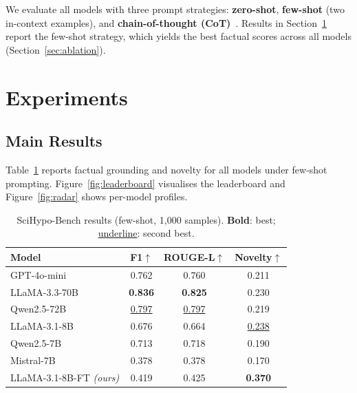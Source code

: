 \documentclass{article}
\begin{document}
We evaluate all models with three prompt strategies:
\textbf{zero-shot}, \textbf{few-shot} (two in-context examples), and
\textbf{chain-of-thought (CoT)}~\cite{wei2022chain}.
Results in Section~\ref{sec:experiments} report the few-shot strategy, which
yields the best factual scores across all models
(Section~\ref{sec:ablation}).

\section{Experiments}
\label{sec:experiments}

\subsection{Main Results}

Table~\ref{tab:main_results} reports factual grounding and novelty for all
models under few-shot prompting.
Figure~\ref{fig:leaderboard} visualises the leaderboard and
Figure~\ref{fig:radar} shows per-model profiles.

\begin{table}[h]
\centering\small
\caption{SciHypo-Bench results (few-shot, 1{,}000 samples).
\textbf{Bold}: best; \underline{underline}: second best.}
\label{tab:main_results}
\setlength{\tabcolsep}{5pt}
\begin{tabular}{l ccc}
\toprule
\textbf{Model} & \textbf{F1}$\uparrow$ & \textbf{ROUGE-L}$\uparrow$ & \textbf{Novelty}$\uparrow$ \\
\midrule
GPT-4o-mini              & 0.762          & 0.760          & 0.211 \\
LLaMA-3.3-70B            & \textbf{0.836} & \textbf{0.825} & 0.230 \\
Qwen2.5-72B              & \underline{0.797} & \underline{0.797} & 0.219 \\
LLaMA-3.1-8B             & 0.676          & 0.664          & \underline{0.238} \\
Qwen2.5-7B               & 0.713          & 0.718          & 0.190 \\
Mistral-7B               & 0.378          & 0.378          & 0.170 \\
\midrule
LLaMA-3.1-8B-FT \textit{(ours)} & 0.419 & 0.425 & \textbf{0.370} \\
\bottomrule
\end{tabular}
\end{table}
\end{document}
